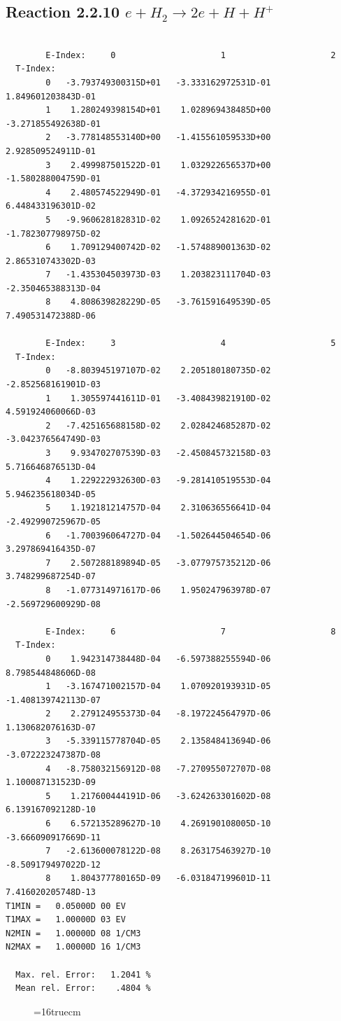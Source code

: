 \documentclass[12pt,dvipdfmx]{article}
\begin{document}
\subsection{
Reaction 2.2.10  $ e + H_2  \rightarrow 2e + H + H^+  $ }

\begin{small}\begin{verbatim}

        E-Index:     0                     1                     2
  T-Index:
        0   -3.793749300315D+01   -3.333162972531D-01    1.849601203843D-01
        1    1.280249398154D+01    1.028969438485D+00   -3.271855492638D-01
        2   -3.778148553140D+00   -1.415561059533D+00    2.928509524911D-01
        3    2.499987501522D-01    1.032922656537D+00   -1.580288004759D-01
        4    2.480574522949D-01   -4.372934216955D-01    6.448433196301D-02
        5   -9.960628182831D-02    1.092652428162D-01   -1.782307798975D-02
        6    1.709129400742D-02   -1.574889001363D-02    2.865310743302D-03
        7   -1.435304503973D-03    1.203823111704D-03   -2.350465388313D-04
        8    4.808639828229D-05   -3.761591649539D-05    7.490531472388D-06

        E-Index:     3                     4                     5
  T-Index:
        0   -8.803945197107D-02    2.205180180735D-02   -2.852568161901D-03
        1    1.305597441611D-01   -3.408439821910D-02    4.591924060066D-03
        2   -7.425165688158D-02    2.028424685287D-02   -3.042376564749D-03
        3    9.934702707539D-03   -2.450845732158D-03    5.716646876513D-04
        4    1.229222932630D-03   -9.281410519553D-04    5.946235618034D-05
        5    1.192181214757D-04    2.310636556641D-04   -2.492990725967D-05
        6   -1.700396064727D-04   -1.502644504654D-06    3.297869416435D-07
        7    2.507288189894D-05   -3.077975735212D-06    3.748299687254D-07
        8   -1.077314971617D-06    1.950247963978D-07   -2.569729600929D-08

        E-Index:     6                     7                     8
  T-Index:
        0    1.942314738448D-04   -6.597388255594D-06    8.798544848606D-08
        1   -3.167471002157D-04    1.070920193931D-05   -1.408139742113D-07
        2    2.279124955373D-04   -8.197224564797D-06    1.130682076163D-07
        3   -5.339115778704D-05    2.135848413694D-06   -3.072223247387D-08
        4   -8.758032156912D-08   -7.270955072707D-08    1.100087131523D-09
        5    1.217600444191D-06   -3.624263301602D-08    6.139167092128D-10
        6    6.572135289627D-10    4.269190108005D-10   -3.666090917669D-11
        7   -2.613600078122D-08    8.263175463927D-10   -8.509179497022D-12
        8    1.804377780165D-09   -6.031847199601D-11    7.416020205748D-13
T1MIN =   0.05000D 00 EV
T1MAX =   1.00000D 03 EV
N2MIN =   1.00000D 08 1/CM3
N2MAX =   1.00000D 16 1/CM3

  Max. rel. Error:   1.2041 %
  Mean rel. Error:    .4804 %
\end{verbatim}\end{small}
\begin{figure} \label{2.2.10}
\epsfxsize=16truecm
\end{figure}
\newpage
\end{document}
